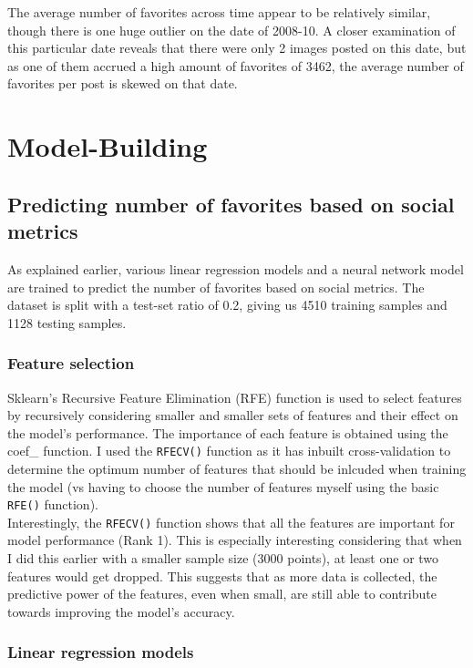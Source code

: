 \documentclass[11pt]{article}
\begin{document}
The average number of favorites across time appear to be relatively
similar, though there is one huge outlier on the date of 2008-10. A
closer examination of this particular date reveals that there were only
2 images posted on this date, but as one of them accrued a high amount
of favorites of 3462, the average number of favorites per post is skewed
on that date.
\newpage
    \section{Model-Building}

\subsection{Predicting number of favorites based on social metrics}

As explained earlier, various linear regression models and a neural
network model are trained to predict the number of favorites based on
social metrics. The dataset is split with a test-set ratio of 0.2,
giving us 4510 training samples and 1128 testing samples.

\subsubsection{Feature selection}

Sklearn's Recursive Feature Elimination (RFE) function is used to select
features by recursively considering smaller and smaller sets of features
and their effect on the model's performance. The importance of each
feature is obtained using the coef\_ function. I used the
\texttt{RFECV()} function as it has inbuilt cross-validation to
determine the optimum number of features that should be inlcuded when
training the model (vs having to choose the number of features myself
using the basic \texttt{RFE()} function).\\

Interestingly, the \texttt{RFECV()} function shows that all the features
are important for model performance (Rank 1). This is especially
interesting considering that when I did this earlier with a smaller
sample size (3000 points), at least one or two features would get
dropped. This suggests that as more data is collected, the predictive
power of the features, even when small, are still able to contribute
towards improving the model's accuracy.

\subsubsection{Linear regression models}
\end{document}
